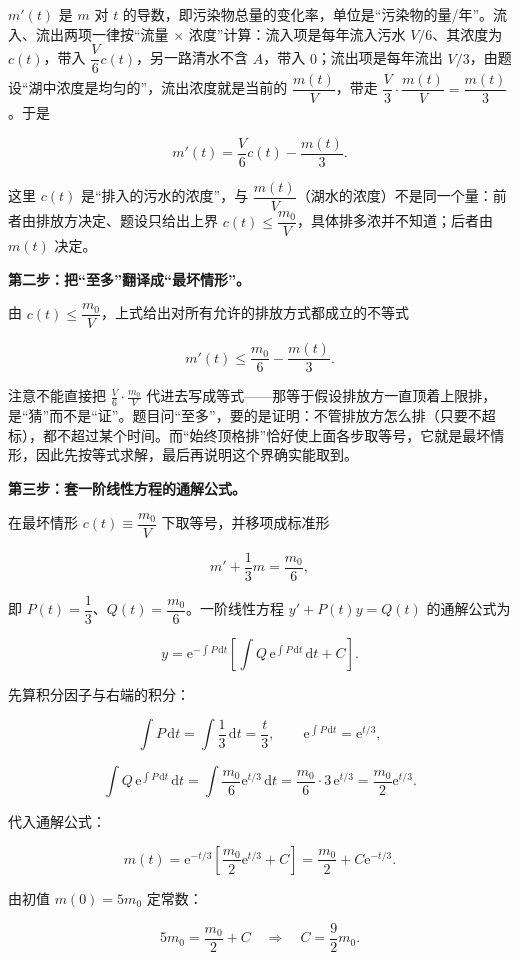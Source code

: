 \documentclass[UTF8,11pt,fontset=windows]{ctexart}
\begin{document}
$m'(t)$ 是 $m$ 对 $t$ 的导数，即污染物总量的变化率，单位是“污染物的量/年”。流入、流出两项一律按“流量 $\times$ 浓度”计算：流入项是每年流入污水 $V/6$、其浓度为 $c(t)$，带入 $\dfrac V6c(t)$，另一路清水不含 $A$，带入 $0$；流出项是每年流出 $V/3$，由题设“湖中浓度是均匀的”，流出浓度就是当前的 $\dfrac{m(t)}V$，带走 $\dfrac V3\cdot\dfrac{m(t)}V=\dfrac{m(t)}3$。于是

$$
m'(t)=\frac V6c(t)-\frac{m(t)}3.
$$

这里 $c(t)$ 是“排入的污水的浓度”，与 $\dfrac{m(t)}V$（湖水的浓度）不是同一个量：前者由排放方决定、题设只给出上界 $c(t)\le\dfrac{m_0}V$，具体排多浓并不知道；后者由 $m(t)$ 决定。

\textbf{第二步：把“至多”翻译成“最坏情形”。}

由 $c(t)\le\dfrac{m_0}V$，上式给出对所有允许的排放方式都成立的不等式

$$
m'(t)\le\frac{m_0}6-\frac{m(t)}3.
$$

注意不能直接把 $\frac V6\cdot\frac{m_0}V$ 代进去写成等式——那等于假设排放方一直顶着上限排，是“猜”而不是“证”。题目问“至多”，要的是证明：不管排放方怎么排（只要不超标），都不超过某个时间。而“始终顶格排”恰好使上面各步取等号，它就是最坏情形，因此先按等式求解，最后再说明这个界确实能取到。

\textbf{第三步：套一阶线性方程的通解公式。}

在最坏情形 $c(t)\equiv\dfrac{m_0}V$ 下取等号，并移项成标准形

$$
m'+\frac13m=\frac{m_0}6,
$$

即 $P(t)=\dfrac13$、$Q(t)=\dfrac{m_0}6$。一阶线性方程 $y'+P(t)y=Q(t)$ 的通解公式为

$$
y=\mathrm e^{-\int P\,\mathrm dt}\left[\int Q\,\mathrm e^{\int P\,\mathrm dt}\,\mathrm dt+C\right].
$$

先算积分因子与右端的积分：

$$
\int P\,\mathrm dt=\int\frac13\,\mathrm dt=\frac t3,
\qquad \mathrm e^{\int P\,\mathrm dt}=\mathrm e^{t/3},
$$

$$
\int Q\,\mathrm e^{\int P\,\mathrm dt}\,\mathrm dt
=\int\frac{m_0}6\mathrm e^{t/3}\,\mathrm dt
=\frac{m_0}6\cdot3\,\mathrm e^{t/3}
=\frac{m_0}2\mathrm e^{t/3}.
$$

代入通解公式：

$$
m(t)=\mathrm e^{-t/3}\left[\frac{m_0}2\mathrm e^{t/3}+C\right]
=\frac{m_0}2+C\mathrm e^{-t/3}.
$$

由初值 $m(0)=5m_0$ 定常数：

$$
5m_0=\frac{m_0}2+C
\quad\Longrightarrow\quad
C=\frac92m_0.
$$
\end{document}
